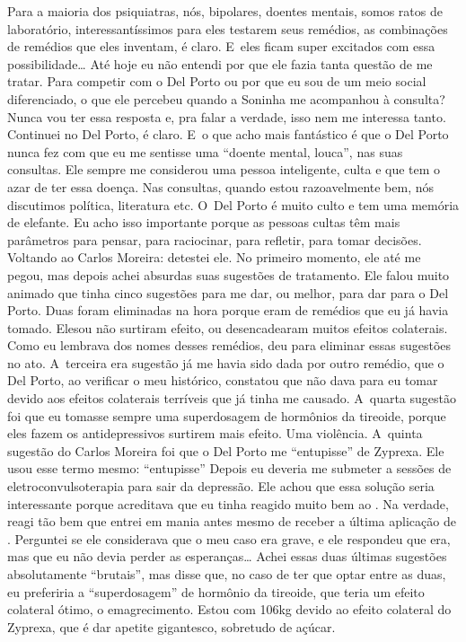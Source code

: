 Para a maioria dos psiquiatras, nós, bipolares, doentes mentais, somos
ratos de laboratório, interessantíssimos para eles testarem seus
remédios, as combinações de remédios que eles inventam, é claro. E~eles
ficam super excitados com essa possibilidade… Até hoje eu não
entendi por que ele fazia tanta questão de me tratar. Para competir com
o Del Porto ou por que eu sou de um meio social diferenciado, o que ele
percebeu quando a Soninha me acompanhou à consulta? Nunca vou ter essa
resposta e, pra falar a verdade, isso nem me interessa tanto. Continuei
no Del Porto, é claro. E~o que acho mais fantástico é que o Del Porto
nunca fez com que eu me sentisse uma ``doente mental, louca'', nas suas
consultas. Ele sempre me considerou uma pessoa inteligente, culta e que
tem o azar de ter essa doença. Nas consultas, quando estou razoavelmente
bem, nós discutimos política, literatura etc. O~Del Porto é muito culto
e tem uma memória de elefante. Eu acho isso importante porque as pessoas
cultas têm mais parâmetros para pensar, para raciocinar, para refletir,
para tomar decisões. Voltando ao Carlos Moreira: detestei ele. No
primeiro momento, ele até me pegou, mas depois achei absurdas suas
sugestões de tratamento. Ele falou muito animado que tinha cinco
sugestões para me dar, ou melhor, para dar para o Del Porto. Duas foram
eliminadas na hora porque eram de remédios que eu já havia tomado.
Elesou não surtiram efeito, ou desencadearam muitos efeitos colaterais.
Como eu lembrava dos nomes desses remédios, deu para eliminar essas
sugestões no ato. A~terceira era sugestão já me havia sido dada por
outro remédio, que o Del Porto, ao verificar o meu histórico, constatou
que não dava para eu tomar devido aos efeitos colaterais terríveis que
já tinha me causado. A~quarta sugestão foi que eu tomasse sempre uma
superdosagem de hormônios da tireoide, porque eles fazem os
antidepressivos surtirem mais efeito. Uma violência. A~quinta sugestão
do Carlos Moreira foi que o Del Porto me ``entupisse'' de Zyprexa. Ele
usou esse termo mesmo: ``entupisse'' Depois eu deveria me submeter a
sessões de eletroconvulsoterapia para sair da depressão. Ele achou que
essa solução seria interessante porque acreditava que eu tinha reagido
muito bem ao . Na verdade, reagi tão bem que entrei em mania antes
mesmo de receber a última aplicação de . Perguntei se ele considerava
que o meu caso era grave, e ele respondeu que era, mas que eu não devia
perder as esperanças… Achei essas duas últimas sugestões
absolutamente ``brutais'', mas disse que, no caso de ter que optar entre
as duas, eu preferiria a ``superdosagem'' de hormônio da tireoide, que
teria um efeito colateral ótimo, o emagrecimento. Estou com 106kg devido
ao efeito colateral do Zyprexa, que é dar apetite gigantesco, sobretudo
de açúcar.

